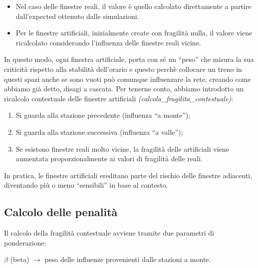 \documentclass[a4paper,12pt]{report}
\begin{document}
\begin{itemize}
    \item Nel caso delle finestre reali, il valore è quello calcolato direttamente a partire dall’expected ottenuto dalle simulazioni.
  
    \item Per le finestre artificiali, inizialmente create con fragilità nulla, il valore viene ricalcolato considerando l’influenza delle finestre reali vicine.

\end{itemize}
In questo modo, ogni finestra artificiale, porta con sé un “peso” che misura la sua criticità rispetto alla stabilità dell’orario e questo perchè collocare un treno in questi spazi anche se sono vuoti può comunque influenzare la rete, creando come abbiamo già detto, disagi a cascata.
Per tenerne conto, abbiamo introdotto un ricalcolo contestuale delle finestre artificiali \textit{(calcola\_fragilita\_contestuale)}:

\begin{enumerate}
    \item Si guarda alla stazione precedente (influenza “a monte”);
    \item Si guarda alla stazione successiva (influenza “a valle”);
    \item Se esistono finestre reali molto vicine, la fragilità delle artificiali viene aumentata proporzionalmente ai valori di fragilità delle reali.
\end{enumerate}
In pratica, le finestre artificiali ereditano parte del rischio delle finestre adiacenti, diventando più o meno “sensibili” in base al contesto.

\subsection{Calcolo delle penalità}
Il calcolo della fragilità contestuale avviene tramite due parametri di ponderazione:

$\beta$ (beta) $\rightarrow$ peso delle influenze provenienti dalle stazioni a monte.
\end{document}
